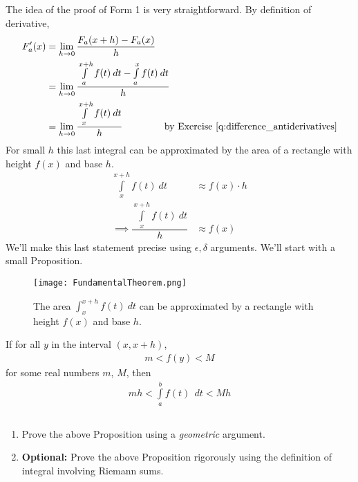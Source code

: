 The idea of the proof of Form 1 is very straightforward. By definition of derivative,
\begin{align}
	\begin{split}
		F_a'(x)
		& = \lim \limits_{h \rightarrow 0} \dfrac{F_a(x+h) - F_a(x)}{h}                                                                                                 \\
		& = \lim \limits_{h \rightarrow 0} \dfrac{\int \limits_a^{x+h} f(t) \:dt - \int \limits_a^x f(t) \:dt}{h}                                                           \\
		& = \lim \limits_{h \rightarrow 0} \dfrac{\int \limits_x^{x+h} f(t) \:dt}{h}
		\qquad
		\qquad
		\mbox{ by Exercise } \ref{q:difference_antiderivatives}
	\end{split}
	\label{eq:Fundamental_Theorem_Reduction}
\end{align}
For small $h$ this last integral can be approximated by the area of a rectangle with height $f(x)$ and base $h$.
\begin{align*}
	\int \limits_x^{x+h} f(t) \:dt
	 & \approx f(x) \cdot h \\
	\implies \dfrac{\int \limits_x^{x+h} f(t) \:dt}{h}
	 & \approx f(x)
\end{align*}
We'll make this last statement precise using $\epsilon, \delta$ arguments. We'll start with a small Proposition.
\begin{figure}[t]
	\centering
	\texttt{[image: FundamentalTheorem.png]}
	\caption*{The area $\int_x^{x+h} f(t)\:dt$ can be approximated by a rectangle with height $f(x)$ and base $h$.}
\end{figure}

\begin{prop}
	\label{theorem:Fundamental_theorem_lemma}
	If for all $ y$ in the interval $(x,x+h)$,
	\begin{align*}
	m < f(y) < M
	\end{align*}
	for some real numbers $m$, $M$, then
	\begin{align*}
		mh < \int \limits_{a}^{b} f(t) \: \:dt < Mh
	\end{align*}
\end{prop}
\begin{exercise}$ $
	\begin{enumerate}
		\item Prove the above Proposition using a {\it geometric} argument.
		\item \textbf{Optional: } Prove the above Proposition rigorously using the definition of integral involving Riemann sums.
	\end{enumerate}
\end{exercise}

